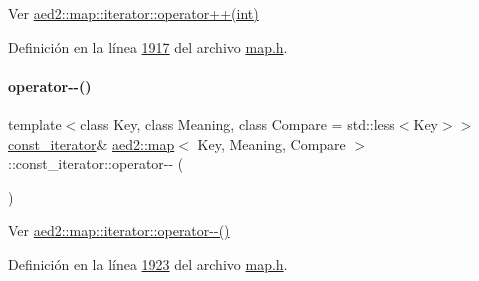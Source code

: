 Ver \hyperlink{classaed2_1_1map_1_1iterator_af4fe5565eb478cfccd254b2ef230b974_af4fe5565eb478cfccd254b2ef230b974}{aed2\+::map\+::iterator\+::operator++(int)} 



Definición en la línea \hyperlink{map_8h_source_l01917}{1917} del archivo \hyperlink{map_8h_source}{map.\+h}.

\mbox{\label{classaed2_1_1map_1_1const__iterator_ae12d6608eeca05957fa3de3f50287c90_ae12d6608eeca05957fa3de3f50287c90}} 
\paragraph{\texorpdfstring{operator-\/-\/()}{operator--()}\hspace{0.1cm}{\footnotesize\ttfamily [1/2]}}
{\footnotesize\ttfamily template$<$class Key, class Meaning, class Compare = std\+::less$<$\+Key$>$$>$ \\
\hyperlink{classaed2_1_1map_1_1const__iterator}{const\+\_\+iterator}\& \hyperlink{classaed2_1_1map}{aed2\+::map}$<$ Key, Meaning, Compare $>$\+::const\+\_\+iterator\+::operator-\/-\/ (\begin{DoxyParamCaption}{ }\end{DoxyParamCaption})\hspace{0.3cm}{\ttfamily [inline]}}



Ver \hyperlink{classaed2_1_1map_1_1iterator_ae7f70f71545d2a9de17b65edaaec748a_ae7f70f71545d2a9de17b65edaaec748a}{aed2\+::map\+::iterator\+::operator-\/-\/()} 



Definición en la línea \hyperlink{map_8h_source_l01923}{1923} del archivo \hyperlink{map_8h_source}{map.\+h}.

\mbox{\label{classaed2_1_1map_1_1const__iterator_ad5ae1cb1d000ac1f528ff32f9af3e228_ad5ae1cb1d000ac1f528ff32f9af3e228}} 
